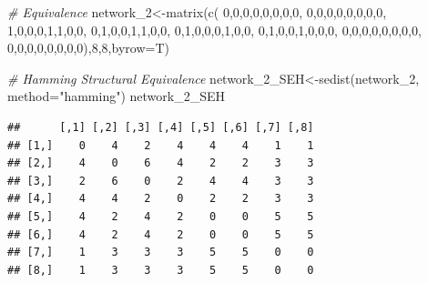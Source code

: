 \documentclass[
  notitlepage,
  onecolumn,
  openany]{book}
\newenvironment{Shaded}{\begin{snugshade}}{\end{snugshade}}
\newcommand{\AttributeTok}[1]{\textcolor[rgb]{0.77,0.63,0.00}{#1}}
\newcommand{\CommentTok}[1]{\textcolor[rgb]{0.56,0.35,0.01}{\textit{#1}}}
\newcommand{\DecValTok}[1]{\textcolor[rgb]{0.00,0.00,0.81}{#1}}
\newcommand{\FunctionTok}[1]{\textcolor[rgb]{0.00,0.00,0.00}{#1}}
\newcommand{\NormalTok}[1]{#1}
\newcommand{\OtherTok}[1]{\textcolor[rgb]{0.56,0.35,0.01}{#1}}
\newcommand{\StringTok}[1]{\textcolor[rgb]{0.31,0.60,0.02}{#1}}
\begin{document}
\begin{Shaded}
\begin{Highlighting}[]
\CommentTok{\# Equivalence}
\NormalTok{network\_2}\OtherTok{\textless{}{-}}\FunctionTok{matrix}\NormalTok{(}\FunctionTok{c}\NormalTok{(}
  \DecValTok{0}\NormalTok{,}\DecValTok{0}\NormalTok{,}\DecValTok{0}\NormalTok{,}\DecValTok{0}\NormalTok{,}\DecValTok{0}\NormalTok{,}\DecValTok{0}\NormalTok{,}\DecValTok{0}\NormalTok{,}\DecValTok{0}\NormalTok{,}
  \DecValTok{0}\NormalTok{,}\DecValTok{0}\NormalTok{,}\DecValTok{0}\NormalTok{,}\DecValTok{0}\NormalTok{,}\DecValTok{0}\NormalTok{,}\DecValTok{0}\NormalTok{,}\DecValTok{0}\NormalTok{,}\DecValTok{0}\NormalTok{,}
  \DecValTok{1}\NormalTok{,}\DecValTok{0}\NormalTok{,}\DecValTok{0}\NormalTok{,}\DecValTok{0}\NormalTok{,}\DecValTok{1}\NormalTok{,}\DecValTok{1}\NormalTok{,}\DecValTok{0}\NormalTok{,}\DecValTok{0}\NormalTok{,}
  \DecValTok{0}\NormalTok{,}\DecValTok{1}\NormalTok{,}\DecValTok{0}\NormalTok{,}\DecValTok{0}\NormalTok{,}\DecValTok{1}\NormalTok{,}\DecValTok{1}\NormalTok{,}\DecValTok{0}\NormalTok{,}\DecValTok{0}\NormalTok{,}
  \DecValTok{0}\NormalTok{,}\DecValTok{1}\NormalTok{,}\DecValTok{0}\NormalTok{,}\DecValTok{0}\NormalTok{,}\DecValTok{0}\NormalTok{,}\DecValTok{1}\NormalTok{,}\DecValTok{0}\NormalTok{,}\DecValTok{0}\NormalTok{,}
  \DecValTok{0}\NormalTok{,}\DecValTok{1}\NormalTok{,}\DecValTok{0}\NormalTok{,}\DecValTok{0}\NormalTok{,}\DecValTok{1}\NormalTok{,}\DecValTok{0}\NormalTok{,}\DecValTok{0}\NormalTok{,}\DecValTok{0}\NormalTok{,}
  \DecValTok{0}\NormalTok{,}\DecValTok{0}\NormalTok{,}\DecValTok{0}\NormalTok{,}\DecValTok{0}\NormalTok{,}\DecValTok{0}\NormalTok{,}\DecValTok{0}\NormalTok{,}\DecValTok{0}\NormalTok{,}\DecValTok{0}\NormalTok{,}
  \DecValTok{0}\NormalTok{,}\DecValTok{0}\NormalTok{,}\DecValTok{0}\NormalTok{,}\DecValTok{0}\NormalTok{,}\DecValTok{0}\NormalTok{,}\DecValTok{0}\NormalTok{,}\DecValTok{0}\NormalTok{,}\DecValTok{0}\NormalTok{),}\DecValTok{8}\NormalTok{,}\DecValTok{8}\NormalTok{,}\AttributeTok{byrow=}\NormalTok{T)}

\CommentTok{\# Hamming Structural Equivalence}
\NormalTok{network\_2\_SEH}\OtherTok{\textless{}{-}}\FunctionTok{sedist}\NormalTok{(network\_2, }\AttributeTok{method=}\StringTok{"hamming"}\NormalTok{)}
\NormalTok{network\_2\_SEH}
\end{Highlighting}
\end{Shaded}

\begin{verbatim}
##      [,1] [,2] [,3] [,4] [,5] [,6] [,7] [,8]
## [1,]    0    4    2    4    4    4    1    1
## [2,]    4    0    6    4    2    2    3    3
## [3,]    2    6    0    2    4    4    3    3
## [4,]    4    4    2    0    2    2    3    3
## [5,]    4    2    4    2    0    0    5    5
## [6,]    4    2    4    2    0    0    5    5
## [7,]    1    3    3    3    5    5    0    0
## [8,]    1    3    3    3    5    5    0    0
\end{verbatim}
\end{document}
